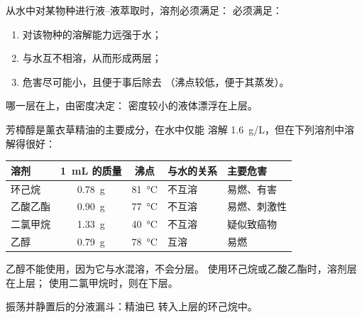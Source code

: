 \begin{method}[选择萃取溶剂]\label{met:g10:chemical-species:solvent}
从水中对某物种进行液–液萃取时，溶剂必须满足：
必须满足：
\begin{enumerate}
  \item 对该物种的溶解能力远强于水；
  \item 与水互不相溶，从而形成两层；
  \item 危害尽可能小，且便于事后除去
        （沸点较低，便于其蒸发）。
\end{enumerate}
哪一层在上，由密度决定：
密度较小的液体漂浮在上层。
\end{method}

\begin{example}[薰衣草精油的溶剂]\label{ex:g10:chemical-species:table}
芳樟醇是薰衣草精油的主要成分，在水中仅能
溶解 \qty{1.6}{g/L}，但在下列溶剂中溶解得很好：
\begin{center}
\small
\begin{tabular}{lccll}
\hline
溶剂 & \qty{1}{mL} 的质量 & 沸点 & 与水的关系 & 主要危害 \\
\hline
环己烷 & \qty{0.78}{g} & \qty{81}{\celsius} & 不互溶 & 易燃、有害 \\
乙酸乙酯 & \qty{0.90}{g} & \qty{77}{\celsius} & 不互溶 & 易燃、刺激性 \\
二氯甲烷 & \qty{1.33}{g} & \qty{40}{\celsius} & 不互溶 & 疑似致癌物 \\
乙醇 & \qty{0.79}{g} & \qty{78}{\celsius} & 互溶 & 易燃 \\
\hline
\end{tabular}
\end{center}
乙醇不能使用，因为它与水混溶，不会分层。
使用环己烷或乙酸乙酯时，溶剂层在上层；
使用二氯甲烷时，则在下层。
\end{example}

\begin{omfigure}

{\small 振荡并静置后的分液漏斗：精油已
转入上层的环己烷中。}
\end{omfigure}

